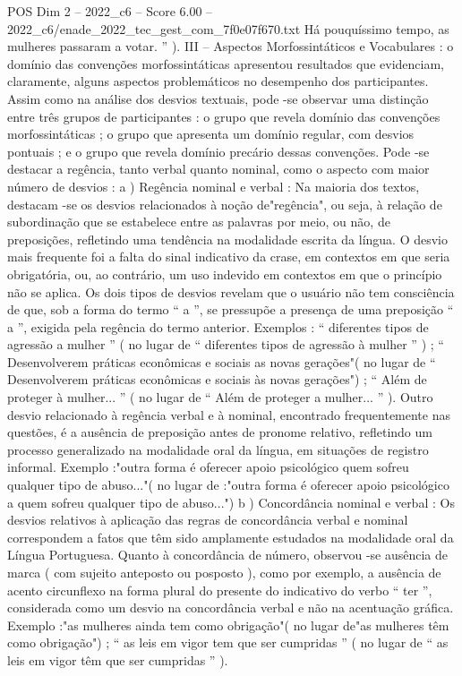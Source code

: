 \begin{textsample}{POS Dim 2 – 2022\_c6 – Score 6.00 – 2022\_c6/enade\_2022\_tec\_gest\_com\_7f0e07f670.txt}
Há pouquíssimo tempo, as mulheres passaram a votar. ” ).
III – Aspectos Morfossintáticos e Vocabulares : o domínio das convenções morfossintáticas apresentou resultados que evidenciam, claramente, alguns aspectos problemáticos no desempenho dos participantes.
Assim como na análise dos desvios textuais, pode -se observar uma distinção entre três grupos de participantes : o grupo que revela domínio das convenções morfossintáticas ; o grupo que apresenta um domínio regular, com desvios pontuais ; e o grupo que revela domínio precário dessas convenções.
Pode -se destacar a regência, tanto verbal quanto nominal, como o aspecto com maior número de desvios : a ) Regência nominal e verbal : Na maioria dos textos, destacam -se os desvios relacionados à noção de"regência", ou seja, à relação de subordinação que se estabelece entre as palavras por meio, ou não, de preposições, refletindo uma tendência na modalidade escrita da língua.
O desvio mais frequente foi a falta do sinal indicativo da crase, em contextos em que seria obrigatória, ou, ao contrário, um uso indevido em contextos em que o princípio não se aplica.
Os dois tipos de desvios revelam que o usuário não tem consciência de que, sob a forma do termo “ a ”, se pressupõe a presença de uma preposição “ a ”, exigida pela regência do termo anterior.
Exemplos : “ diferentes tipos de agressão a mulher ” ( no lugar de “ diferentes tipos de agressão à mulher ” ) ; “ Desenvolverem práticas econômicas e sociais as novas gerações"( no lugar de “ Desenvolverem práticas econômicas e sociais às novas gerações") ; “ Além de proteger à mulher... ” ( no lugar de “ Além de proteger a mulher... ” ).
Outro desvio relacionado à regência verbal e à nominal, encontrado frequentemente nas questões, é a ausência de preposição antes de pronome relativo, refletindo um processo generalizado na modalidade oral da língua, em situações de registro informal.
Exemplo :"outra forma é oferecer apoio psicológico quem sofreu qualquer tipo de abuso..."( no lugar de :"outra forma é oferecer apoio psicológico a quem sofreu qualquer tipo de abuso...") b ) Concordância nominal e verbal : Os desvios relativos à aplicação das regras de concordância verbal e nominal correspondem a fatos que têm sido amplamente estudados na modalidade oral da Língua Portuguesa.
Quanto à concordância de número, observou -se ausência de marca ( com sujeito anteposto ou posposto ), como por exemplo, a ausência de acento circunflexo na forma plural do presente do indicativo do verbo “ ter ”, considerada como um desvio na concordância verbal e não na acentuação gráfica.
Exemplo :"as mulheres ainda tem como obrigação"( no lugar de"as mulheres têm como obrigação") ; “ as leis em vigor tem que ser cumpridas ” ( no lugar de “ as leis em vigor têm que ser cumpridas ” ).

\end{textsample}
